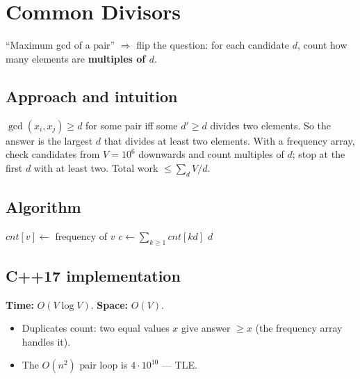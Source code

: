 \section{Common Divisors}
\label{sec:n-common-div}


\begin{patternbox}
``Maximum gcd of a pair'' $\Rightarrow$ flip the question: for each candidate
$d$, count how many elements are \textbf{multiples of $d$}.
\end{patternbox}

\subsection*{Approach and intuition}

$\gcd(x_i,x_j)\ge d$ for some pair iff some $d'\ge d$ divides two elements.
So the answer is the largest $d$ that divides at least two elements. With a
frequency array, check candidates from $V=10^6$ downwards and count multiples of
$d$; stop at the first $d$ with at least two. Total work $\le\sum_d V/d$.

\subsection*{Algorithm}
\begin{algorithmic}[1]
\State $cnt[v]\gets$ frequency of $v$
  \State $c\gets\sum_{k\ge1}cnt[kd]$
   \Return $d$ \EndIf
\EndFor
\end{algorithmic}


\subsection*{C++17 implementation}

\begin{complexitybox}
\textbf{Time:} $O(V\log V)$. \textbf{Space:} $O(V)$.
\end{complexitybox}

\begin{pitfallbox}
\begin{itemize}
  \item Duplicates count: two equal values $x$ give answer $\ge x$ (the
        frequency array handles it).
  \item The $O(n^2)$ pair loop is $4\cdot10^{10}$ --- TLE.
\end{itemize}
\end{pitfallbox}
